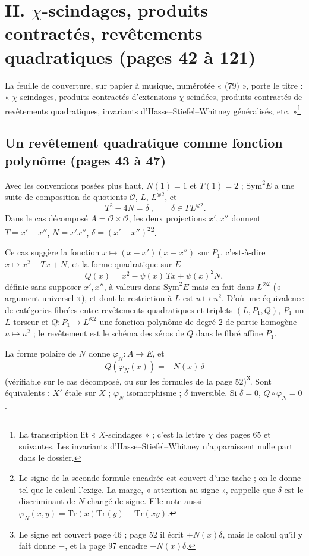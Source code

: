 \documentclass[11pt,a4paper]{article}
\begin{document}
\section*{II. $\chi$-scindages, produits contractés, revêtements quadratiques (pages 42 à 121)}

La feuille de couverture, sur papier à musique, numérotée « (79) », porte le
titre : « $\chi$-scindages, produits contractés d'extensions $\chi$-scindées,
produits contractés de revêtements quadratiques, invariants
d'Hasse--Stiefel--Whitney généralisés, etc. »\footnote{La transcription lit
« $X$-scindages » ; c'est la lettre $\chi$ des pages 65 et suivantes. Les invariants
d'Hasse--Stiefel--Whitney n'apparaissent nulle part dans le dossier.}

\subsection*{Un revêtement quadratique comme fonction polynôme (pages 43 à 47)}

Avec les conventions posées plus haut, $N(1) = 1$ et $T(1) = 2$ ; $\mathrm{Sym}^{2}E$
a une suite de composition de quotients $\mathcal{O}$, $L$, $L^{\otimes 2}$, et
\[
  \boxed{\ T^{2} - 4N = \delta\ }, \qquad \delta \in \Gamma L^{\otimes 2}.
\]
Dans le cas décomposé $A = \mathcal{O} \times \mathcal{O}$, les deux projections
$x', x''$ donnent $T = x' + x''$, $N = x'x''$, $\delta = (x' - x'')^{2}$\footnote{Le
signe de la seconde formule encadrée est couvert d'une tache ; on le donne tel que
le calcul l'exige. La marge, « attention au signe », rappelle que $\delta$ est le
discriminant de $N$ changé de signe. Elle note aussi $\varphi_N(x, y) =
\mathrm{Tr}(x)\mathrm{Tr}(y) - \mathrm{Tr}(xy)$.}.

Ce cas suggère la fonction $x \mapsto (x - x')(x - x'')$ sur $P_1$, c'est-à-dire
$x \mapsto x^{2} - Tx + N$, et la forme quadratique sur $E$
\[
  Q(x) = x^{2} - \psi(x)\,Tx + \psi(x)^{2}N ,
\]
définie sans supposer $x', x''$, à valeurs dans $\mathrm{Sym}^{2}E$ mais en fait dans
$L^{\otimes 2}$ (« argument universel »), et dont la restriction à $L$ est
$u \mapsto u^{2}$. D'où une équivalence de catégories fibrées entre revêtements
quadratiques et triplets $(L, P_1, Q)$, $P_1$ un $L$-torseur et
$Q : P_1 \to L^{\otimes 2}$ une fonction polynôme de degré $2$ de partie homogène
$u \mapsto u^{2}$ ; le revêtement est le schéma des zéros de $Q$ dans le fibré
affine $P_1$.

La forme polaire de $N$ donne $\varphi_N : A \to E$, et
\[
  \boxed{\ Q(\varphi_N(x)) = -N(x)\,\delta\ }
\]
(vérifiable sur le cas décomposé, ou sur les formules de la page 52)\footnote{Le
signe est couvert page 46 ; page 52 il écrit $+N(x)\delta$, mais le calcul
qu'il y fait donne $-$, et la page 97 encadre $-N(x)\delta$.}. Sont équivalents :
$X'$ étale sur $X$ ; $\varphi_N$ isomorphisme ; $\delta$ inversible. Si $\delta = 0$,
$Q \circ \varphi_N = 0$.
\end{document}
